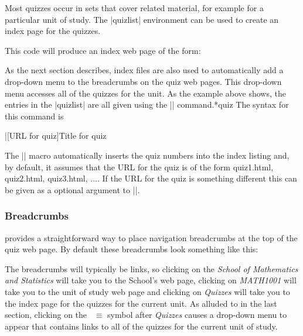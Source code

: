 \documentclass[svgnames]{article}
\begin{document}
  Most quizzes occur in sets that cover related material, for example
  for a particular unit of study. The \LatexCode|quizlist| environment can be
  used to create an index page for the quizzes.


  This code will produce an index web page of the form:


  As the next section describes, index files are also used to
  automatically add a drop-down menu to the breadcrumbs on the quiz web
  pages. This drop-down menu accesses all of the quizzes for the unit.
  As the example above shows, the entries in the \LatexCode|quizlist| are all
  given using the \LatexCode|\quiz| command.*{quiz} The syntax for this command is

  \begin{latexcode}
      \quiz|[URL for quiz]{Title for quiz}
  \end{latexcode}

  \noindent
  The \LatexCode|\quiz| macro automatically inserts the quiz numbers
  into the index listing and, by default, it assumes that the URL for the quiz
  is of the form \textsf{quiz1.html}, \textsf{quiz2.html},
  \textsf{quiz3.html}, .... If the URL for the quiz is something
  different this can be given as a optional argument to \LatexCode|\quiz|.

  \subsubsection{Breadcrumbs}\label{SS:breadcrumbs}

  \WebQuiz provides a straightforward way to place navigation breadcrumbs
  at the top of the quiz web page. By default these
  breadcrumbs look something like this:


  \noindent
  The breadcrumbs will typically be links, so clicking on the
  \textit{School of Mathematics and Statistics} will take you to the
  School's web page, clicking on \textit{MATH1001} will take you to the
  unit of study web page and clicking on \textit{Quizzes} will take you
  to the index page for the quizzes for the current unit. As alluded to
  in the last section, clicking on the~{\large\color{red} $\equiv$} symbol after
  \textit{Quizzes} causes a drop-down menu to appear that
  contains links to all of the quizzes for the current unit of study.
\end{document}
